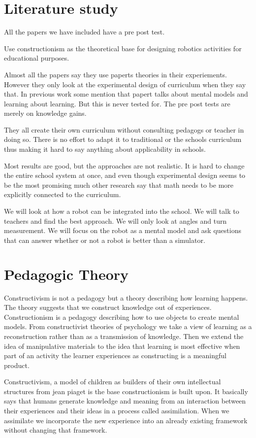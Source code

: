 \section{Literature study}
All the papers we have included have a pre post test.

Use constructionism as the theoretical base for designing robotics activities for educational purposes.

Almost all the papers say they use paperts theories in their experiements. However they only look at the experimental design of curriculum when they say that. In previous work some mention that papert talks about mental models and learning about learning. But this is never tested for. The pre post tests are merely on knowledge gains. 

They all create their own curriculum without consulting pedagogs or teacher in doing so. There is no effort to adapt it to traditional or the schools curriculum thus making it hard to say anything about applicability in schools. 

Most results are good, but the approaches are not realistic. It is hard to change the entire school system at once, and even though experimental design seems to be the most promising much other research say that math needs to be more explicitly connected to the curriculum.

We will look at how a robot can be integrated into the school. We will talk to teachers and find the best approach. We will only look at angles and turn measurement. We will focus on the robot as a mental model and ask questions that can answer whether or not a robot is better than a simulator.

\section{Pedagogic Theory}
Constructivism is not a pedagogy but a theory describing how learning happens. The theory suggests that we construct knowledge out of experiences. 
Constructionism is a pedagogy describing how to use objects to create mental models. From constructivist theories of psychology we take a view of learning as a reconstruction rather than as a transmission of knowledge. Then we extend the idea of manipulative materials to the idea that learning is most effective when part of an activity the learner experiences as constructing is a meaningful product. 

Constructivism, a model of children as builders of their own intellectual structures from jean piaget is the base constructionism is built upon. It basically says that humans generate knowledge and meaning from an interaction between their experiences and their ideas in a process called assimilation. When we assimilate we incorporate the new experience into an already existing framework without changing that framework. 

